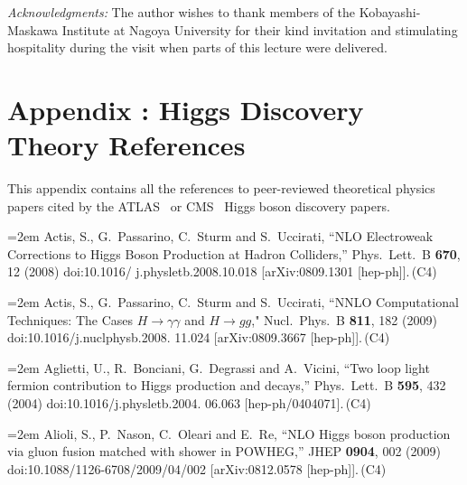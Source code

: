 \documentclass[letter,12pt]{article}
\def\xbibitem#1#2#3{\noindent\hangindent=2em #2\,(#3)}
\begin{document}
\bigskip
\noindent
{\it Acknowledgments: } The author wishes to thank members of the Kobayashi-Maskawa Institute at Nagoya University for their kind invitation and stimulating hospitality during the visit when parts of this lecture were delivered. 

\vfill\eject
\section*{Appendix : Higgs Discovery Theory References}

This appendix contains all the references to peer-reviewed theoretical physics papers cited by the ATLAS~\cite{Aad:2012tfa} or CMS~\cite{Chatrchyan:2012xdj} Higgs boson discovery papers.

\bigskip

%
\xbibitem{Actis:2008ug}{Actis, S., G.~Passarino, C.~Sturm and S.~Uccirati,
  ``NLO Electroweak Corrections to Higgs Boson Production at Hadron Colliders,''
  Phys.\ Lett.\ B {\bf 670}, 12 (2008)
  doi:10.1016/ j.physletb.2008.10.018
  [arXiv:0809.1301 [hep-ph]].}{C4}

\xbibitem{Actis:2008ts}{Actis, S., G.~Passarino, C.~Sturm and S.~Uccirati,
  ``NNLO Computational Techniques: The Cases $H\to\gamma\gamma$ and $H\to gg$,"
   Nucl.\ Phys.\ B {\bf 811}, 182 (2009)
  doi:10.1016/j.nuclphysb.2008. 11.024
  [arXiv:0809.3667 [hep-ph]].}{C4}
  
\xbibitem{Aglietti:2004nj}{Aglietti, U., R.~Bonciani, G.~Degrassi and A.~Vicini,
  ``Two loop light fermion contribution to Higgs production and decays,''
  Phys.\ Lett.\ B {\bf 595}, 432 (2004)
  doi:10.1016/j.physletb.2004. 06.063
  [hep-ph/0404071].}{C4}

\xbibitem{Alioli:2008tz}{Alioli, S., P.~Nason, C.~Oleari and E.~Re,
  ``NLO Higgs boson production via gluon fusion matched with shower in POWHEG,''
  JHEP {\bf 0904}, 002 (2009)
  doi:10.1088/1126-6708/2009/04/002
  [arXiv:0812.0578 [hep-ph]].}{C4}
     
\end{document}

